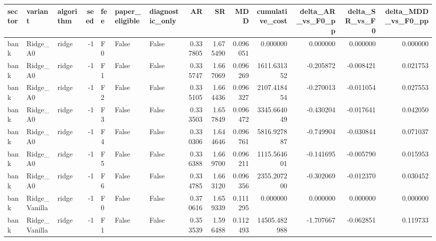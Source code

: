\begin{tabular}{lllrlllrrrrrrr}
\toprule
    sector &        variant & algorithm &  seed & fee &  paper\_eligible &  diagnostic\_only &        AR &        SR &      MDD &  cumulative\_cost &  delta\_AR\_vs\_F0\_pp &  delta\_SR\_vs\_F0 &  delta\_MDD\_vs\_F0\_pp \\
\midrule
      bank &       Ridge\_A0 &     ridge &    -1 &  F0 &           False &            False &  0.337805 &  1.675490 & 0.096051 &         0.000000 &           0.000000 &        0.000000 &            0.000000 \\
      bank &       Ridge\_A0 &     ridge &    -1 &  F1 &           False &            False &  0.335747 &  1.667069 & 0.096269 &      1611.631352 &          -0.205872 &       -0.008421 &            0.021753 \\
      bank &       Ridge\_A0 &     ridge &    -1 &  F2 &           False &            False &  0.335105 &  1.664436 & 0.096327 &      2107.418454 &          -0.270013 &       -0.011054 &            0.027553 \\
      bank &       Ridge\_A0 &     ridge &    -1 &  F3 &           False &            False &  0.333503 &  1.657849 & 0.096472 &      3345.664049 &          -0.430204 &       -0.017641 &            0.042050 \\
      bank &       Ridge\_A0 &     ridge &    -1 &  F4 &           False &            False &  0.330306 &  1.644646 & 0.096761 &      5816.927887 &          -0.749904 &       -0.030844 &            0.071037 \\
      bank &       Ridge\_A0 &     ridge &    -1 &  F5 &           False &            False &  0.336388 &  1.669700 & 0.096211 &      1115.564601 &          -0.141695 &       -0.005790 &            0.015953 \\
      bank &       Ridge\_A0 &     ridge &    -1 &  F6 &           False &            False &  0.334785 &  1.663120 & 0.096356 &      2355.207200 &          -0.302069 &       -0.012370 &            0.030452 \\
      bank &  Ridge\_Vanilla &     ridge &    -1 &  F0 &           False &            False &  0.370616 &  1.659339 & 0.111295 &         0.000000 &           0.000000 &        0.000000 &            0.000000 \\
      bank &  Ridge\_Vanilla &     ridge &    -1 &  F1 &           False &            False &  0.353539 &  1.596488 & 0.112493 &     14505.482988 &          -1.707667 &       -0.062851 &            0.119733 \\

\end{tabular}
